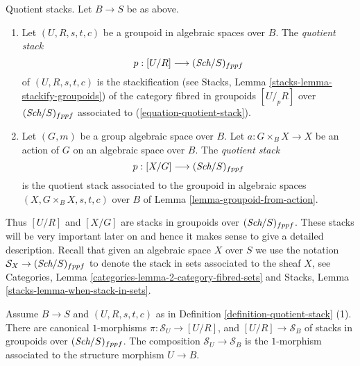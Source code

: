 \begin{definition}
\label{definition-quotient-stack}
Quotient stacks. Let $B \to S$ be as above.
\begin{enumerate}
\item Let $(U, R, s, t, c)$ be a groupoid in algebraic spaces over $B$.
The {\it quotient stack}
$$
p : [U/R] \longrightarrow (\textit{Sch}/S)_{fppf}
$$
of $(U, R, s, t, c)$ is the stackification (see
Stacks, Lemma \ref{stacks-lemma-stackify-groupoids})
of the category fibred in groupoids $[U/_{\!p}R]$ over
$(\textit{Sch}/S)_{fppf}$ associated to
(\ref{equation-quotient-stack}).
\item Let $(G, m)$ be a group algebraic space over $B$.
Let $a : G \times_B X \to X$ be an action of $G$ on an algebraic space
over $B$. The {\it quotient stack}
$$
p : [X/G] \longrightarrow (\textit{Sch}/S)_{fppf}
$$
is the quotient stack associated to the groupoid in algebraic spaces
$(X, G \times_B X, s, t, c)$ over $B$ of
Lemma \ref{lemma-groupoid-from-action}.
\end{enumerate}
\end{definition}

\noindent
Thus $[U/R]$ and $[X/G]$ are stacks in groupoids over
$(\textit{Sch}/S)_{fppf}$. These stacks will be very important later
on and hence it makes sense to give a detailed description.
Recall that given an algebraic space $X$ over $S$ we use the
notation $\mathcal{S}_X \to (\textit{Sch}/S)_{fppf}$ to denote
the stack in sets associated to the sheaf $X$, see
Categories, Lemma \ref{categories-lemma-2-category-fibred-sets}
and
Stacks, Lemma \ref{stacks-lemma-when-stack-in-sets}.

\begin{lemma}
\label{lemma-quotient-stack-arrows}
Assume $B \to S$ and $(U, R, s, t, c)$ as in
Definition \ref{definition-quotient-stack} (1).
There are canonical $1$-morphisms
$\pi : \mathcal{S}_U \to [U/R]$, and $[U/R] \to \mathcal{S}_B$
of stacks in groupoids over $(\textit{Sch}/S)_{fppf}$.
The composition $\mathcal{S}_U \to \mathcal{S}_B$ is the $1$-morphism
associated to the structure morphism $U \to B$.
\end{lemma}

